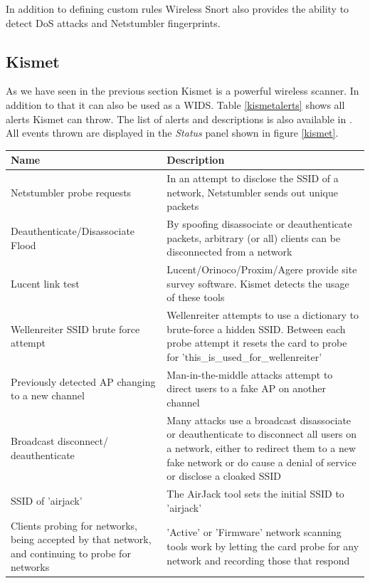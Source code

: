 In addition to defining custom rules Wireless Snort also provides the ability to detect DoS attacks and Netstumbler fingerprints.

\subsection*{Kismet}

As we have seen in the previous section Kismet is a powerful wireless scanner. In addition to that it can also be used as a WIDS. Table \ref{kismetalerts}  shows all alerts Kismet can throw. The list of alerts and descriptions is also available in \cite{kismet_readme}. All events thrown are displayed in the {\em Status} panel shown in figure \ref{kismet}.

\begin{table}[htbp]
	\begin{center}
		\begin{tabular}{|p{150pt}|p{200pt}|}
		\hline
		\bf{Name}&\bf{Description}\\
		\hline
		Netstumbler probe requests&In an attempt to disclose the SSID of a network, Netstumbler sends out unique packets\\
		\hline
		Deauthenticate/Disassociate Flood&By spoofing disassociate or deauthenticate packets, arbitrary (or all) clients can be disconnected from a
network\\
		\hline
		Lucent link test&Lucent/Orinoco/Proxim/Agere provide site survey 
software. Kismet detects the usage of these tools\\
		\hline
		Wellenreiter SSID brute force attempt&Wellenreiter attempts to use a dictionary to brute-force a hidden SSID.  Between each probe attempt it resets the card to probe for 'this\_is\_used\_for\_wellenreiter'\\
		\hline
		Previously detected AP changing to a new channel&Man-in-the-middle attacks attempt to direct users to a fake AP on another channel\\
		\hline
		Broadcast disconnect/ deauthenticate&Many attacks use a broadcast disassociate or deauthenticate to disconnect all users on a network, 
either to redirect them to a new fake network or do cause a denial of service or disclose a cloaked SSID\\
		\hline
		SSID of 'airjack'&The AirJack tool sets the initial SSID to 'airjack'\\
		\hline
		Clients probing for networks, being accepted by that network, and continuing to probe for networks&'Active' or 'Firmware' network scanning tools work by letting the card probe for any network and recording those that respond\\

\end{tabular}
\end{center}
\end{table}
